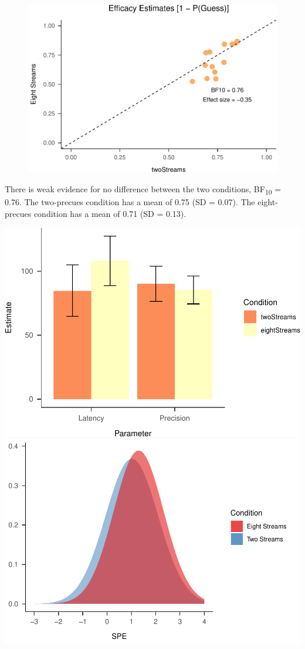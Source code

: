 \documentclass[,man]{apa6}
\theoremstyle{definition}
\theoremstyle{definition}
\theoremstyle{definition}
\theoremstyle{remark}
\begin{document}
\begin{figure}
\centering
\includegraphics{nStreams_Bayesian_files/figure-latex/unnamed-chunk-10-1.pdf}
\caption{}
\end{figure}

There is weak evidence for no difference between the two conditions,
BF\textsubscript{10} = 0.76. The two-precues condition has a mean of
0.75 (SD = 0.07). The eight-precues condition has a mean of 0.71 (SD =
0.13).

\includegraphics{nStreams_Bayesian_files/figure-latex/unnamed-chunk-11-1.pdf}
\includegraphics{nStreams_Bayesian_files/figure-latex/unnamed-chunk-11-2.pdf}
\end{document}
